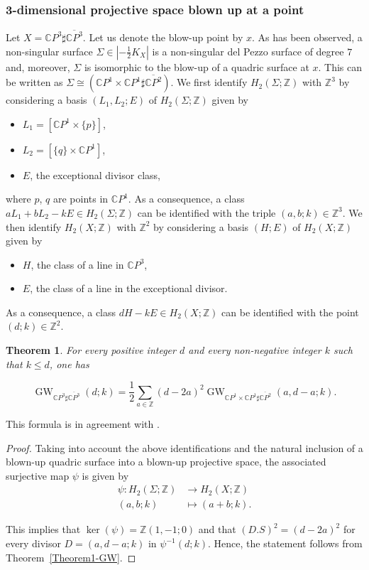 \documentclass[11pt]{amsart}
\numberwithin{equation}{section}
\theoremstyle{definition}
\theoremstyle{plain}
\newtheorem{theorem}[definition]{Theorem}
\theoremstyle{remark}
\newcommand{\Z}{\mathbb{Z}}
\newcommand{\C}{\mathbb{C}}
\newcommand{\cp}{\mathbb{C}P^2}
\newcommand{\cpp}{\mathbb{C}P^3}
\newcommand{\pp}{\mathbb{C}P^1\times \mathbb{C}P^1}
\DeclareMathOperator{\GW}{GW}
\begin{document}
\subsubsection{3-dimensional projective space blown up at a point} 
   Let $X=\cpp\sharp \overline{\cpp}$. Let us denote the blow-up point by $x$. As has been observed, a non-singular surface $\Sigma \in |-\frac{1}{2}K_X|$ is a non-singular del Pezzo surface of degree $7$ and, moreover, $\Sigma$ is isomorphic to the blow-up of a quadric surface at $x$. This can be written as $\Sigma\cong (\pp \sharp \overline{\cp})$. We first identify $H_2(\Sigma;\mathbb{Z})$ with  $\Z^3$ by considering a basis $(L_1,L_2;E)$ of $H_2(\Sigma;\mathbb{Z})$ given by
\begin{itemize}
    \item $L_1=[\C P^1\times\{p\}]$,
    \item $L_2=[\{q\}\times \C P^1]$,
    \item $E$, the exceptional divisor class, 
\end{itemize}
 where $p$, $q$ are points in $\C P^1$.  As a consequence, a class $a L_1+b L_2-kE\in H_2(\Sigma;\mathbb{Z})$ can be identified with the triple $(a,b;k)\in \Z^3$.     We then identify $H_2(X;\mathbb{Z})$ with  $\Z^2$ by considering a basis $(H;E)$ of $H_2(X;\mathbb{Z})$ given by
\begin{itemize}
    \item $H$, the class of a line in $\cpp$,
    \item $E$, the class of a line in the exceptional divisor.
\end{itemize}

 As a consequence, a class $d H -kE \in H_2(X;\mathbb{Z})$ can be identified with the point $(d;k)\in \Z^2$.

 \begin{theorem} \label{Theorem-GW.in.deg.7}
    For every positive integer $d$ and every non-negative integer $k$ such that $k\leq d$, one has

$$\GW_{\cpp\sharp \overline{\cpp}}(d;k)
        = \frac{1}{2}\sum_{a\in \mathbb{Z}}(d-2a)^2 \GW_{\pp\sharp \overline{\cp}}(a,d-a;k).$$
    \end{theorem}

 This formula is in agreement with \cite[Theorem 1.2]{ding2020remark}.

 \begin{proof}    
Taking into account the above identifications and the natural inclusion of a blown-up quadric surface into a blown-up projective space, the associated surjective map $\psi$ is given by
    \begin{align*}
        \psi\colon H_2(\Sigma;\mathbb{Z})&\longrightarrow H_2(X;\mathbb{Z})\\
        (a,b;k)&\longmapsto (a+b;k).
    \end{align*}
   
    This implies that     $\ker(\psi)=\Z(1,-1;0)$ and that $(D.S)^2=(d-2a)^2$ for every divisor  $D=(a,d-a;k) $ in $\psi^{-1}(d;k)$.  Hence, the statement follows from Theorem~\ref{Theorem1-GW}.
 \end{proof}
\end{document}
